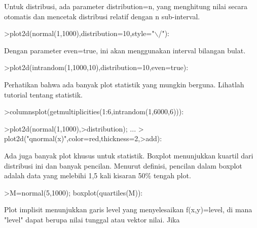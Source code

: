 \documentclass[12pt,Times new roman,letterpaper]{book}
\begin{document}
\begin{eulernootebook}
\begin{eulercomment}
\begin{eulercomment}
\begin{eulernootebook}
\begin{eulercomment}
\begin{eulercomment}
\begin{eulercomment}
\begin{eulercomment}
\begin{eulercomment}
\begin{eulercomment}
\begin{eulercomment}
\begin{eulernotebook}
\begin{eulercomment}
\begin{eulercomment}
\begin{eulercomment}
\begin{eulercomment}
\begin{eulercomment}
Untuk distribusi, ada parameter distribution=n, yang menghitung nilai
secara otomatis dan mencetak distribusi relatif dengan n sub-interval.
\end{eulercomment}
\begin{eulerprompt}
>plot2d(normal(1,1000),distribution=10,style="\(\backslash\)/"):
\end{eulerprompt}
\begin{eulercomment}
Dengan parameter even=true, ini akan menggunakan interval bilangan
bulat.
\end{eulercomment}
\begin{eulerprompt}
>plot2d(intrandom(1,1000,10),distribution=10,even=true):
\end{eulerprompt}
\begin{eulercomment}
Perhatikan bahwa ada banyak plot statistik yang mungkin berguna.
Lihatlah tutorial tentang statistik.
\end{eulercomment}
\begin{eulerprompt}
>columnsplot(getmultiplicities(1:6,intrandom(1,6000,6))):
\end{eulerprompt}
\begin{eulerprompt}
>plot2d(normal(1,1000),>distribution); ...
>  plot2d("qnormal(x)",color=red,thickness=2,>add):
\end{eulerprompt}
\begin{eulercomment}
Ada juga banyak plot khusus untuk statistik. Boxplot menunjukkan
kuartil dari distribusi ini dan banyak pencilan. Menurut definisi,
pencilan dalam boxplot adalah data yang melebihi 1,5 kali kisaran 50\%
tengah plot.
\end{eulercomment}
\begin{eulerprompt}
>M=normal(5,1000); boxplot(quartiles(M)):
\end{eulerprompt}
\begin{eulercomment}
Plot implisit menunjukkan garis level yang menyelesaikan f(x,y)=level,
di mana "level" dapat berupa nilai tunggal atau vektor nilai. Jika

\end{eulercomment}
\end{eulercomment}
\end{eulercomment}
\end{eulercomment}
\end{eulercomment}
\end{eulernotebook}
\end{eulercomment}
\end{eulercomment}
\end{eulercomment}
\end{eulercomment}
\end{eulercomment}
\end{eulercomment}
\end{eulercomment}
\end{eulernootebook}
\end{eulercomment}
\end{eulercomment}
\end{eulernootebook}
\end{document}
